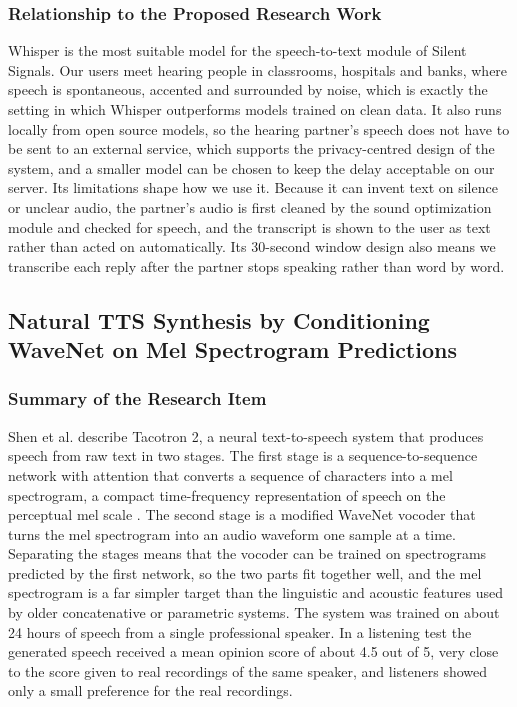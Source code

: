 \documentclass{FastFyp}
\begin{document}
\subsubsection*{Relationship to the Proposed Research Work}
Whisper is the most suitable model for the speech-to-text module of Silent Signals. Our users meet hearing people in classrooms, hospitals and banks, where speech is spontaneous, accented and surrounded by noise, which is exactly the setting in which Whisper outperforms models trained on clean data. It also runs locally from open source models, so the hearing partner's speech does not have to be sent to an external service, which supports the privacy-centred design of the system, and a smaller model can be chosen to keep the delay acceptable on our server. Its limitations shape how we use it. Because it can invent text on silence or unclear audio, the partner's audio is first cleaned by the sound optimization module and checked for speech, and the transcript is shown to the user as text rather than acted on automatically. Its 30-second window design also means we transcribe each reply after the partner stops speaking rather than word by word.

\subsection{Natural TTS Synthesis by Conditioning WaveNet on Mel Spectrogram Predictions}
\subsubsection*{Summary of the Research Item}
Shen et al. \cite{shen2018tacotron2} describe Tacotron 2, a neural text-to-speech system that produces speech from raw text in two stages. The first stage is a sequence-to-sequence network with attention that converts a sequence of characters into a mel spectrogram, a compact time-frequency representation of speech on the perceptual mel scale \cite{stevens1937mel}. The second stage is a modified WaveNet vocoder \cite{vandenoord2016wavenet} that turns the mel spectrogram into an audio waveform one sample at a time. Separating the stages means that the vocoder can be trained on spectrograms predicted by the first network, so the two parts fit together well, and the mel spectrogram is a far simpler target than the linguistic and acoustic features used by older concatenative or parametric systems. The system was trained on about 24 hours of speech from a single professional speaker. In a listening test the generated speech received a mean opinion score of about 4.5 out of 5, very close to the score given to real recordings of the same speaker, and listeners showed only a small preference for the real recordings.
\end{document}
